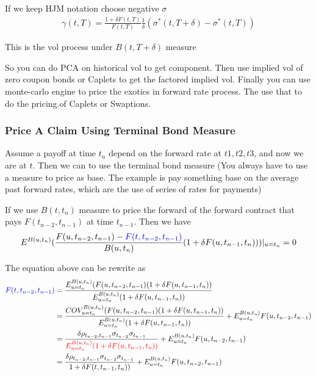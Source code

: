 {\color{blue}If we keep HJM notation choose negative $\sigma$}
\begin{equation}
\begin{aligned}
\gamma(t, T) = \frac{1 + \delta F(t, T) }{F(t, T)} \frac{1}{\delta} ( \sigma^\ast(t, T+\delta) -\sigma^\ast(t, T) )
\end{aligned}
\end{equation}

This is the vol process under $B(t, T + \delta)$ measure

So you can do PCA on historical vol to get component. Then use implied vol of zero coupon bonds or Caplets to get the factored implied vol. Finally you can use monte-carlo engine to price the exotics in forward rate process. The use that to do the pricing.of Caplets or Swaptions.

\subsubsection{Price A Claim Using Terminal Bond Measure}

Assume a payoff at time $t_n$ depend on the forward rate at $t1, t2, t3$, and now we are at $t$. Then we can to use the terminal bond measure {\color{blue} (You always have to use a measure to price as base. The example is pay something base on the average past forward rates, which are the use of series of rates for payments)}

If we use  $B(t, t_n)$ measure to price the forward of the forward contract that pays $F(t_{n-2}, t_{n-1})$ at time $t_{n-1}$. Then we have
\begin{equation}
\begin{aligned}
E^{B(u, t_n)} (\frac{F(u, t_{n-2}, t_{n-1}) - {\color{blue}F(t, t_{n-2}, t_{n-1})}}{B(u, t_n)} (1 + \delta F(u, t_{n-1}, t_{n}))) |_{u=t_n}= 0
\end{aligned}
\end{equation}

The equation above can be rewrite as
\begin{equation}
\begin{aligned}
{\color{blue}F(t, t_{n-2}, t_{n-1})} &= \frac{E^{B(u, t_n)}_{u=t_n} (F(u, t_{n-2}, t_{n-1}) (1 + \delta F(u, t_{n-1}, t_{n}))}{E^{B(u, t_n)}_{u=t_n}(1 + \delta F(u, t_{n-1}, t_{n}))} \\
&= \frac{COV^{B(u, t_n)}_{u=t_n} (F(u, t_{n-2}, t_{n-1}) (1 + \delta F(u, t_{n-1}, t_{n}))}{E^{B(u, t_n)}_{u=t_n}(1 + \delta F(u, t_{n-1}, t_{n}))} + E^{B(u, t_n)}_{u=t_n}F(u, t_{n-2}, t_{n-1})\\
&= \frac{\delta\rho_{t_{n-2}, t_{n-1}}\sigma_{t_{n-2}}\sigma_{t_{n-1}}}{\color{red}E^{B(u, t_n)}_{u=t_n}(1 + \delta F(u, t_{n-1}, t_{n}))} + E^{B(u, t_n)}_{u=t_n}F(u, t_{n-2}, t_{n-1}) \\
&= \frac{\delta\rho_{t_{n-2}, t_{n-1}}\sigma_{t_{n-2}}\sigma_{t_{n-1}}}{1 + \delta F(t, t_{n-1}, t_{n}))} + E^{B(u, t_n)}_{u=t_n}F(u, t_{n-2}, t_{n-1})
\end{aligned}
\end{equation}

